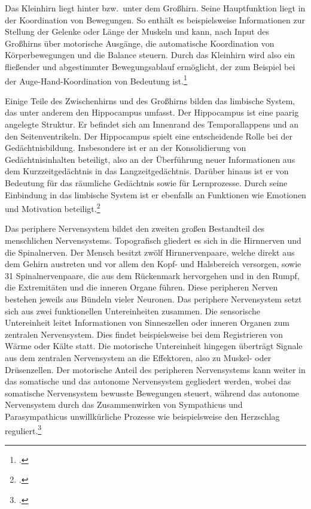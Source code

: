 \documentclass[a4paper, 12pt]{scrreprt}
\begin{document}
        Das Kleinhirn liegt hinter bzw.\ unter dem Großhirn. Seine
        Hauptfunktion liegt in der Koordination von Bewegungen. So enthält es
        beispielsweise Informationen zur Stellung der Gelenke oder Länge der
        Muskeln und kann, nach Input des Großhirns über motorische Ausgänge, die
        automatische Koordination von Körperbewegungen und die Balance steuern.
        Durch das Kleinhirn wird also ein fließender und abgestimmter
        Bewegungsablauf ermöglicht, der zum Beispiel bei der
        Auge-Hand-Koordination von Bedeutung
        ist.\footcite[S.~1106]{Markl1997}
        
        Einige Teile des Zwischenhirns und des Großhirns bilden das
        limbische System, das unter anderem den Hippocampus umfasst.
        Der Hippocampus ist eine paarig angelegte Struktur. Er befindet
        sich am Innenrand des Temporallappens und an den Seitenventrikeln. Der
        Hippocampus spielt eine entscheidende Rolle bei der Gedächtnisbildung.
        Insbesondere ist er an der Konsolidierung von Gedächtnisinhalten
        beteiligt, also an der Überführung neuer Informationen aus dem
        Kurzzeitgedächtnis in das Langzeitgedächtnis. Darüber hinaus ist er von
        Bedeutung für das räumliche Gedächtnis sowie für Lernprozesse. Durch
        seine Einbindung in das limbische System ist er ebenfalls an Funktionen
        wie Emotionen und Motivation
        beteiligt.\footcite{Hoegemann2006}
        
        Das periphere Nervensystem bildet den zweiten großen Bestandteil
        des menschlichen Nervensystems. Topografisch gliedert es sich in die
        Hirnnerven und die Spinalnerven. Der Mensch besitzt zwölf
        Hirnnervenpaare, welche direkt aus dem Gehirn austreten und vor allem
        den Kopf- und Halsbereich versorgen, sowie 31 Spinalnervenpaare, die aus
        dem Rückenmark hervorgehen und in den Rumpf, die Extremitäten und die
        inneren Organe führen. Diese peripheren Nerven bestehen jeweils
        aus Bündeln vieler Neuronen. Das periphere Nervensystem setzt sich aus
        zwei funktionellen Untereinheiten zusammen. Die sensorische Untereinheit
        leitet Informationen von Sinneszellen oder inneren Organen zum zentralen
        Nervensystem. Dies findet beispielsweise bei dem Registrieren von Wärme
        oder Kälte statt. Die motorische Untereinheit hingegen überträgt Signale
        aus dem zentralen Nervensystem an die Effektoren, also zu Muskel- oder
        Drüsenzellen. Der motorische Anteil des peripheren Nervensystems kann
        weiter in das somatische und das autonome Nervensystem gegliedert
        werden, wobei das somatische Nervensystem bewusste Bewegungen steuert,
        während das autonome Nervensystem durch das Zusammenwirken von
        Sympathicus und Parasympathicus unwillkürliche Prozesse wie
        beispielsweise den Herzschlag
        reguliert.\footcite[S.~1100--1102]{Markl1997}
        
\end{document}
